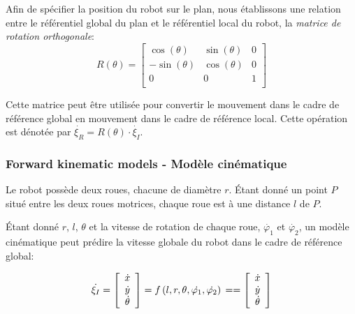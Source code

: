 Afin de spécifier la position du robot sur le plan, nous établissons une relation entre le référentiel global du plan et le référentiel local du robot, la \textit{matrice de rotation orthogonale}:
\begin{equation}
    R(\theta) = \left [
    \begin{array}{ccc}
        \cos(\theta) & \sin(\theta) & 0 \\
        -\sin(\theta) & \cos(\theta) & 0 \\
        0 & 0 & 1 \\
    \end{array}
    \right ]
\end{equation}

Cette matrice peut être utilisée pour convertir le mouvement dans le cadre de référence global en mouvement dans le cadre de référence local. Cette opération est dénotée par $\dot{\xi_R} = R(\theta) \cdot \dot{\xi_I}$.

\subsubsection{Forward kinematic models - Modèle cinématique}

Le robot possède deux roues, chacune de diamètre $r$. Étant donné un point $P$ situé entre les deux roues motrices, chaque roue est à une distance $l$ de $P$.

Étant donné $r$, $l$, $\theta$ et la vitesse de rotation de chaque roue, $\dot{\varphi_1}$ et $\dot{\varphi_2}$, un modèle cinématique peut prédire la vitesse globale du robot dans le cadre de référence global: 

\begin{equation}
    \dot{\xi_I} = \left [\begin{array}{c}
        \dot{x} \\
        \dot{y} \\
        \dot{\theta}
        \end{array} \right ]= f \left ( l, r, \theta, \dot{\varphi_1}, \dot{\varphi_2} \right )\\
        == \left [\begin{array}{c}
        \dot{x} \\
        \dot{y} \\
        \dot{\theta}
        \end{array} \right ]
\end{equation}



